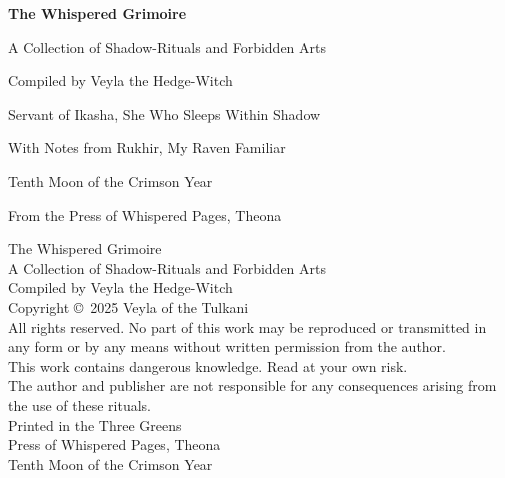 \documentclass[12pt,twoside]{book}
\begin{document}
\frontmatter

\begin{titlepage}
\centering
\vspace*{2cm}
{\Huge\bfseries The Whispered Grimoire\par}
\vspace{1cm}
{\Large A Collection of Shadow-Rituals and Forbidden Arts\par}
\vspace{2cm}
{\Large Compiled by Veyla the Hedge-Witch\par}
\vspace{0.5cm}
{\large Servant of Ikasha, She Who Sleeps Within Shadow\par}
\vspace{1cm}
{\large With Notes from Rukhir, My Raven Familiar\par}
\vspace{3cm}
{\large Tenth Moon of the Crimson Year\par}
\vspace{0.5cm}
{\large From the Press of Whispered Pages, Theona\par}
\end{titlepage}

\newpage
\thispagestyle{empty}
\vspace*{5cm}
\begin{center}
{\small
The Whispered Grimoire\\
A Collection of Shadow-Rituals and Forbidden Arts\\
\vspace{0.5cm}
Compiled by Veyla the Hedge-Witch\\
\vspace{1cm}
Copyright \copyright\ 2025 Veyla of the Tulkani\\
All rights reserved. No part of this work may be reproduced or transmitted in any form or by any means without written permission from the author.\\
\vspace{1cm}
This work contains dangerous knowledge. Read at your own risk.\\
The author and publisher are not responsible for any consequences arising from the use of these rituals.\\
\vspace{1cm}
Printed in the Three Greens\\
Press of Whispered Pages, Theona\\
Tenth Moon of the Crimson Year
}
\end{center}
\end{document}
